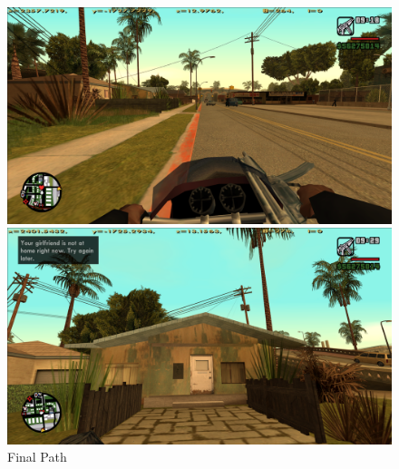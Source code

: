 \documentclass{article}
\begin{document}
	\begin{figure}[!h]
		\centering
		\begin{minipage}{\textwidth}
			\centering
			\includegraphics[width=1\textwidth]{./0img/path5.png}
		\end{minipage}
		\hfill
		\begin{minipage}{\textwidth}
			\centering
			\includegraphics[width= 1\textwidth]{./0img/path6.png}
		\end{minipage}
		\caption{Final Path}
	\end{figure}
	
\end{document}
